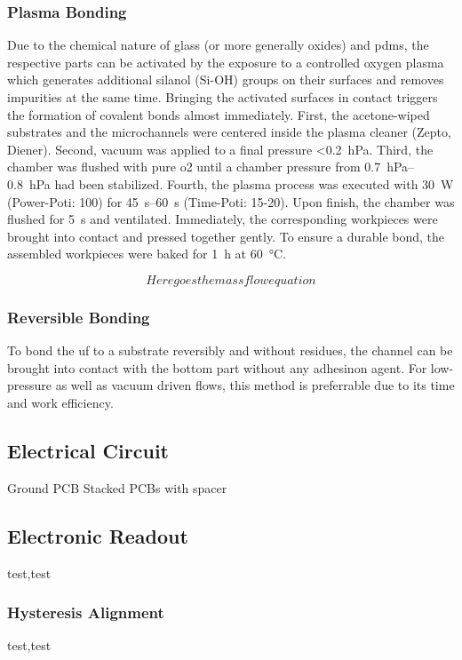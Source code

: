 \subsubsection{Plasma Bonding}
Due to the chemical nature of glass (or more generally oxides) and \gls{pdms}, the respective parts can be activated by the exposure to a controlled oxygen plasma which generates additional silanol (Si-OH) groups on their surfaces and removes impurities at the same time. Bringing the activated surfaces in contact triggers the formation of covalent bonds almost immediately. First, the acetone-wiped substrates and the microchannels were centered inside the plasma cleaner (Zepto, Diener). Second, vacuum was applied to a final pressure <\SI{0.2}{\hecto\pascal}. Third, the chamber was flushed with pure \gls{o2} until a chamber pressure from \SIrange{0.7}{0.8}{\hecto\pascal} had been stabilized. Fourth, the plasma process was executed with \SI{30}{\watt} (Power-Poti: 100) for \SIrange{45}{60}{\second} (Time-Poti: 15-20). Upon finish, the chamber was flushed for \SI{5}{\second} and ventilated. Immediately, the corresponding workpieces were brought into contact and pressed together gently. To ensure a durable bond, the assembled workpieces were baked for \SI{1}{\hour} at \SI{60}{\degreeCelsius}.

\begin{equation}
	Here goes the mass flow equation
\end{equation}

\subsubsection{Reversible Bonding}
To bond the \gls{uf} to a substrate reversibly and without residues, the channel can be brought into contact with the bottom part without any adhesinon agent. For low-pressure as well as vacuum driven flows, this method is preferrable due to its time and work efficiency.

\subsection{Electrical Circuit}
Ground
PCB
Stacked PCBs with spacer
\subsection{Electronic Readout}
test,test
\subsubsection{Hysteresis Alignment}
test,test
